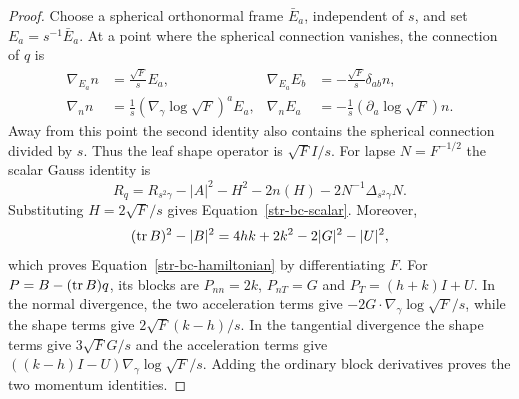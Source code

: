 \begin{proof}
Choose a spherical orthonormal frame $\bar E_a$, independent of $s$, and set
$E_a=s^{-1}\bar E_a$. At a point where the spherical connection vanishes,
the connection of $q$ is
\[
 \begin{aligned}
 \nabla_{E_a}n&=\frac{\sqrt F}{s}E_a,&
 \nabla_{E_a}E_b&=-\frac{\sqrt F}{s}\delta_{ab}n,\\
 \nabla_nn&=\frac1s(\nabla_\gamma\log\sqrt F)^aE_a,&
 \nabla_nE_a&=-\frac1s(\partial_a\log\sqrt F)n.
 \end{aligned}
\]
Away from this point the second identity also contains the spherical
connection divided by $s$. Thus the leaf shape operator is
$\sqrt F I/s$. For lapse $N=F^{-1/2}$ the scalar Gauss identity is
\[
 R_q=R_{s^2\gamma}-|A|^2-H^2-2n(H)-2N^{-1}\Delta_{s^2\gamma}N.
\]
Substituting $H=2\sqrt F/s$ gives
Equation~\eqref{str-bc-scalar}. Moreover,
\[
 (\operatorname{tr} B)^2-|B|^2=4hk+2k^2-2|G|^2-|U|^2,
\]
which proves Equation~\eqref{str-bc-hamiltonian} by differentiating $F$.
For $P=B-(\operatorname{tr} B)q$, its blocks are $P_{nn}=2k$, $P_{nT}=G$ and
$P_T=(h+k)I+U$. In the normal divergence, the two acceleration terms
give $-2G\cdot\nabla_\gamma\log\sqrt F/s$, while the shape terms give
$2\sqrt F(k-h)/s$. In the tangential divergence the shape terms give
$3\sqrt F G/s$ and the acceleration terms give
$((k-h)I-U)\nabla_\gamma\log\sqrt F/s$. Adding the ordinary block
derivatives proves the two momentum identities.
\end{proof}

